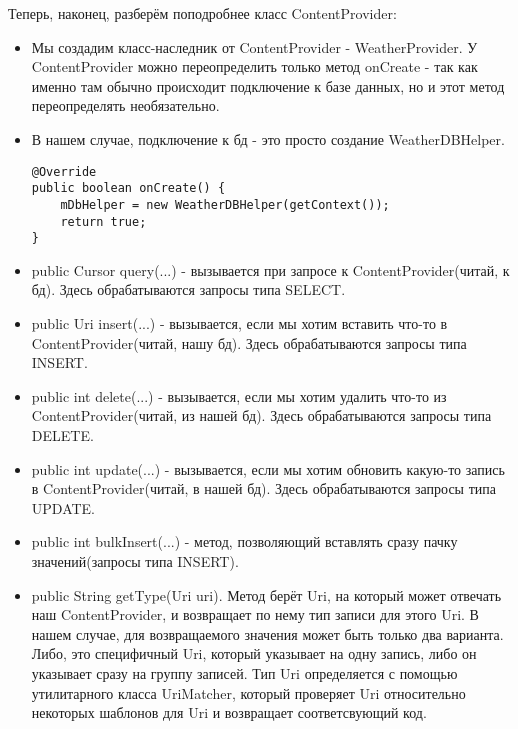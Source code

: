 \documentclass[12 pt]{article}
\begin{document}
	Теперь, наконец, разберём поподробнее класс ContentProvider:
	\begin{itemize}
	    \item Мы создадим класс-наследник от ContentProvider - WeatherProvider. У ContentProvider можно переопределить только метод onCreate - так как именно там обычно происходит подключение к базе данных, но и этот метод переопределять необязательно. 
	    \item В нашем случае, подключение к бд - это просто создание WeatherDBHelper.
	    \begin{lstlisting}
@Override
public boolean onCreate() {
    mDbHelper = new WeatherDBHelper(getContext());
    return true;
}	    
	    \end{lstlisting}
	    \item public Cursor query(...) - вызывается при запросе к ContentProvider(читай, к бд). Здесь обрабатываются запросы типа SELECT.
	    \item public Uri insert(...) - вызывается, если мы хотим вставить что-то в ContentProvider(читай, нашу бд). Здесь обрабатываются запросы типа INSERT.
	    \item public int delete(...) - вызывается, если мы хотим удалить что-то из ContentProvider(читай, из нашей бд). Здесь обрабатываются запросы типа DELETE.
	    \item public int update(...) - вызывается, если мы хотим обновить какую-то запись в ContentProvider(читай, в нашей бд). Здесь обрабатываются запросы типа UPDATE.
	    \item public int bulkInsert(...) - метод, позволяющий вставлять сразу пачку значений(запросы типа INSERT).
	    \item public String getType(Uri uri). Метод берёт Uri, на который может отвечать наш ContentProvider, и возвращает по нему тип записи для этого Uri. В нашем случае, для возвращаемого значения может быть только два варианта. Либо, это специфичный Uri, который указывает на одну запись, либо он указывает сразу на группу записей. Тип Uri определяется с помощью утилитарного класса UriMatcher, который проверяет Uri относительно некоторых шаблонов для Uri и возвращает соответсвующий код. 
	    

\end{itemize}
\end{document}
